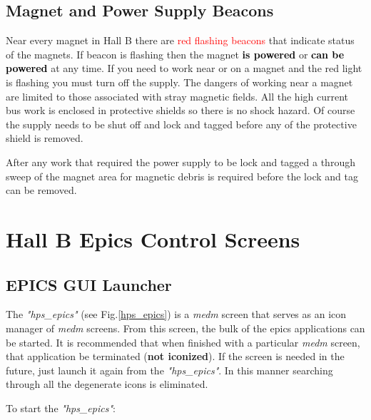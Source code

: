 \documentclass[12pt]{article}
\begin{document}
\subsection{Magnet and Power Supply Beacons}

Near every magnet in Hall B there are \textcolor{red}{red flashing beacons} that indicate status of the magnets. If beacon is
 flashing then the magnet \textbf{\textcolor{black}{is
powered}} or \textbf{\textcolor{black}{can be powered}} at
any time. If you need to work near or on a magnet and the red light is flashing
you must turn off the supply. The dangers of working
near a magnet are limited to those associated with stray magnetic fields. All
the high current bus work is enclosed in protective shields so there is no shock
hazard. Of course the supply needs to be shut off and lock and tagged before
any of the protective shield is removed.

After any work that required the power supply to be lock and tagged a through
sweep of the magnet area for magnetic debris is required before the lock and
tag can be removed.


\section{Hall B Epics Control Screens}


\subsection{EPICS GUI Launcher}

The \emph{"hps\_epics"} (see Fig.\ref{hps_epics}) is a \emph{medm} screen that serves as an icon manager of
\emph{medm} screens. From this screen, the bulk of the epics applications can
be started. It is recommended that when finished with a particular \emph{medm}
screen, that application be terminated (\textbf{not iconized}). If the screen
is needed in the future, just launch it again from the \emph{"hps\_epics"}. In this
manner searching through all the degenerate icons is eliminated. 

To start the \emph{"hps\_epics"}:
\end{document}
